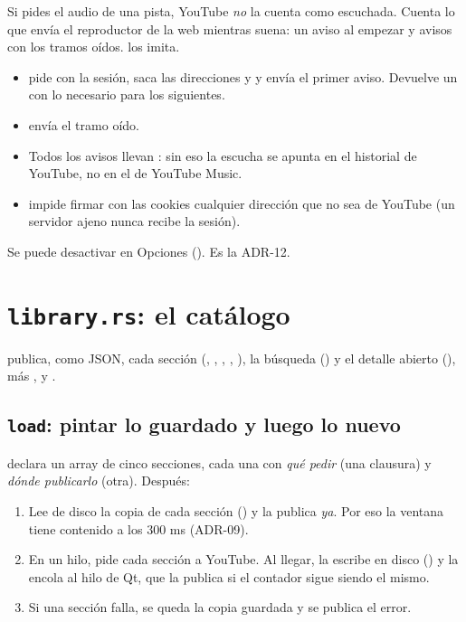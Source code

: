 Si pides el audio de una pista, YouTube \emph{no} la cuenta como escuchada. Cuenta lo que
envía el reproductor de la web mientras suena: un aviso al empezar y avisos con los tramos
oídos.  los imita.

\begin{itemize}
  \item {} pide  con la sesión, saca las direcciones
   y  y envía el primer aviso. Devuelve
  un  con lo necesario para los siguientes.
  \item {} envía el tramo oído.
  \item Todos los avisos llevan : sin eso la escucha se apunta en el
  historial de YouTube, no en el de YouTube Music.
  \item {} impide firmar con las cookies cualquier dirección que no sea de
  YouTube (un servidor ajeno nunca recibe la sesión).
\end{itemize}

Se puede desactivar en Opciones (). Es la ADR-12.

\section{\texttt{library.rs}: el catálogo}

 publica, como JSON, cada sección (, , ,
, ), la búsqueda () y el detalle abierto
(), más ,  y .

\subsection{\texttt{load}: pintar lo guardado y luego lo nuevo}

 declara un array de cinco secciones, cada una con \emph{qué pedir} (una clausura)
y \emph{dónde publicarlo} (otra). Después:

\begin{enumerate}
  \item Lee de disco la copia de cada sección () y la publica \emph{ya}. Por
  eso la ventana tiene contenido a los 300 ms (ADR-09).
  \item En un hilo, pide cada sección a YouTube. Al llegar, la escribe en disco
  () y la encola al hilo de Qt, que la publica si el contador
   sigue siendo el mismo.
  \item Si una sección falla, se queda la copia guardada y se publica el error.
\end{enumerate}

